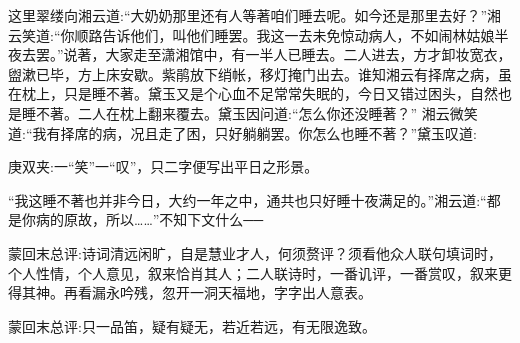 \begin{parag}
    这里翠缕向湘云道:“大奶奶那里还有人等著咱们睡去呢。如今还是那里去好？”湘云笑道:“你顺路告诉他们，叫他们睡罢。我这一去未免惊动病人，不如闹林姑娘半夜去罢。”说著，大家走至潇湘馆中，有一半人已睡去。二人进去，方才卸妆宽衣，盥漱已毕，方上床安歇。紫鹃放下绡帐，移灯掩门出去。谁知湘云有择席之病，虽在枕上，只是睡不著。黛玉又是个心血不足常常失眠的，今日又错过困头，自然也是睡不著。二人在枕上翻来覆去。黛玉因问道:“怎么你还没睡著？” 湘云微笑道:“我有择席的病，况且走了困，只好躺躺罢。你怎么也睡不著？”黛玉叹道:\begin{note}庚双夹:一“笑”一“叹”，只二字便写出平日之形景。\end{note}“我这睡不著也并非今日，大约一年之中，通共也只好睡十夜满足的。”湘云道:“都是你病的原故，所以……”不知下文什么──
\end{parag}


\begin{parag}
    \begin{note}蒙回末总评:诗词清远闲旷，自是慧业才人，何须赘评？须看他众人联句填词时，个人性情，个人意见，叙来恰肖其人；二人联诗时，一番讥评，一番赏叹，叙来更得其神。再看漏永吟残，忽开一洞天福地，字字出人意表。\end{note}
\end{parag}


\begin{parag}
    \begin{note}蒙回末总评:只一品笛，疑有疑无，若近若远，有无限逸致。\end{note}
\end{parag}